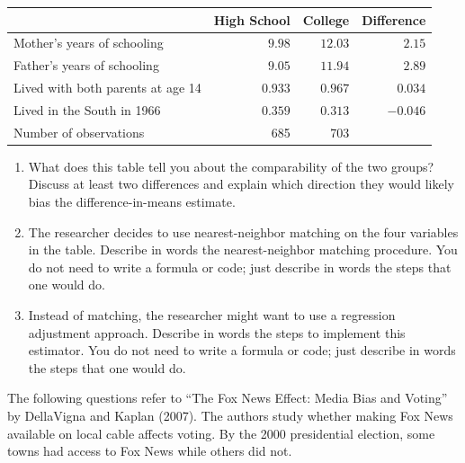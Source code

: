 \documentclass[12pt]{article}
\begin{document}
\begin{enumerate}
  \begin{center}
    \begin{tabular}{lrrr}
      \toprule
      & High School & College & Difference \\
      \midrule
      Mother's years of schooling & $9.98$ & $12.03$ & $2.15$ \\
      Father's years of schooling & $9.05$ & $11.94$ & $2.89$ \\
      Lived with both parents at age 14 & $0.933$ & $0.967$ & $0.034$ \\
      Lived in the South in 1966 & $0.359$ & $0.313$ & $-0.046$ \\
      \midrule
      Number of observations & 685 & 703 & \\
      \bottomrule
    \end{tabular}
  \end{center}

  \bigskip
  \begin{enumerate}[label=(\alph*)]
    \item What does this table tell you about the comparability of the two groups?
    Discuss at least two differences and explain which direction they would likely bias  the difference-in-means estimate.

    \item The researcher decides to use nearest-neighbor matching on the four variables in the table.
    Describe in words the nearest-neighbor matching procedure. 
    You do not need to write a formula or code; just describe in words the steps that one would do.

    \item Instead of matching, the researcher might want to use a regression adjustment approach. 
    Describe in words the steps to implement this estimator. 
    You do not need to write a formula or code; just describe in words the steps that one would do.
  \end{enumerate}
\end{enumerate}

\newpage
\noindent
The following questions refer to ``The Fox News Effect: Media Bias and Voting'' by DellaVigna and Kaplan (2007).
The authors study whether making Fox News available on local cable affects voting.
By the 2000 presidential election, some towns had access to Fox News while others did not.
\end{document}
